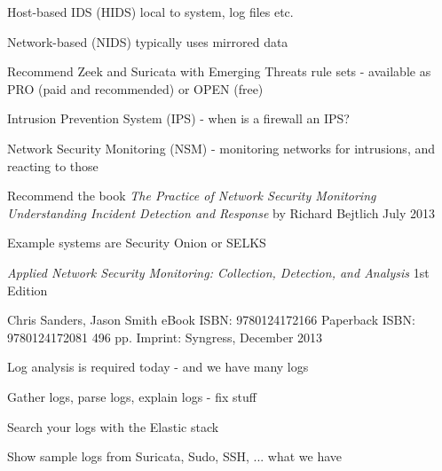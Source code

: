 \documentclass[Screen16to9,17pt]{foils}
\begin{document}


\begin{list1}
\item Host-based IDS (HIDS) local to system, log files etc.
\item Network-based (NIDS) typically uses mirrored data
\item Recommend Zeek  and Suricata  with Emerging Threats rule sets  - available as PRO (paid and recommended) or OPEN (free)
\item Intrusion Prevention System (IPS) - when is a firewall an IPS?
\end{list1}



\begin{list1}
\item Network Security Monitoring (NSM) - monitoring networks for intrusions, and reacting to those
\item Recommend the book \emph{The Practice of Network Security Monitoring
Understanding Incident Detection and Response}
by Richard Bejtlich
July 2013
\item Example systems are Security Onion  or SELKS 
\end{list1}



\emph{Applied Network Security Monitoring: Collection, Detection, and Analysis}
1st Edition

Chris Sanders, Jason Smith
eBook ISBN: 9780124172166
Paperback ISBN: 9780124172081 496 pp.
Imprint: Syngress, December 2013

{\footnotesize{}}



\begin{list1}
\item Log analysis is required today - and we have many logs
\item Gather logs, parse logs, explain logs - fix stuff
\item Search your logs with the Elastic stack
\item Show sample logs from Suricata, Sudo, SSH, ... what we have
\end{list1}
\end{document}
